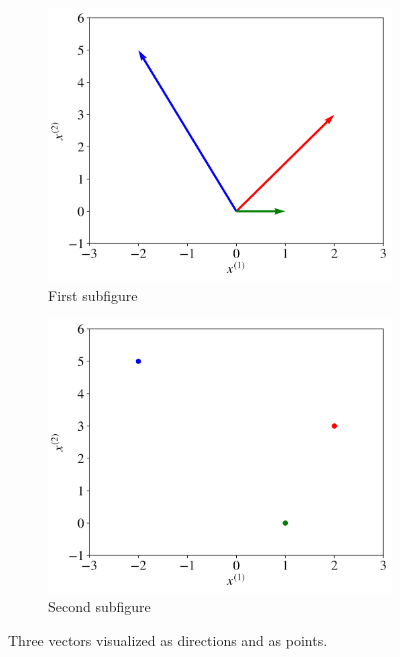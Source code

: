 \begin{figure}[H]
	\begin{subfigure}[t]{0.45\linewidth}
		\centering
		\includegraphics[width=\linewidth]{imgs/notation/notation_1}
		\caption{First subfigure}
	\end{subfigure}
	\hfill %
	\begin{subfigure}[t]{0.45\linewidth}
		\centering
		\includegraphics[width=\linewidth]{imgs/notation/notation_2}
		\caption{Second subfigure}
	\end{subfigure}
	\caption{Three vectors visualized as directions and as points.}
	\label{fig:notation_1}
\end{figure}

